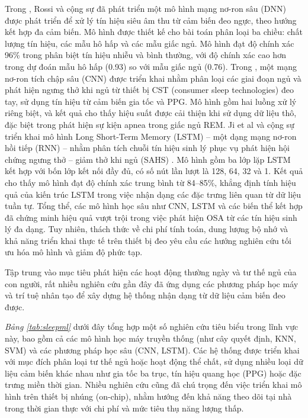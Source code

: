 Trong \cite{rossi2023sleep}, Rossi và cộng sự đã phát triển một mô hình mạng nơ-ron sâu 
(DNN) được phát triển 
để xử lý tín hiệu siêu âm
thu từ cảm biến đeo ngực, theo hướng kết hợp đa cảm biến. 
Mô hình được thiết kế cho bài toán phân loại ba chiều: 
chất lượng tín hiệu, các mẫu hô hấp và các mẫu giấc ngủ. 
Mô hình đạt độ chính xác 96\% trong phân biệt tín hiệu nhiễu 
và bình thường, với độ chính xác cao hơn trong dự đoán mẫu 
hô hấp (0.93) so với mẫu giấc ngủ (0.76).
Trong \cite{olsen2024transfer}, một mạng nơ-ron tích chập sâu (CNN) 
được triển khai nhằm phân loại các giai đoạn ngủ và phát hiện ngưng 
thở khi ngủ từ thiết bị CST (consumer sleep technologies) đeo tay, 
sử dụng tín hiệu từ cảm biến gia tốc và PPG. Mô hình gồm hai luồng 
xử lý riêng biệt, và kết quả cho thấy hiệu suất được cải thiện khi 
sử dụng dữ liệu thô, đặc biệt trong phát hiện sự kiện apnea trong 
giấc ngủ REM. 
Ji et al và cộng sự triển khai mô hình Long Short-Term Memory (LSTM) 
– một dạng mạng nơ-ron hồi tiếp (RNN) – 
nhằm phân tích chuỗi tín hiệu sinh lý phục vụ phát hiện hội chứng ngưng thở – 
giảm thở khi ngủ (SAHS) \cite{ji2022airline}. 
Mô hình gồm ba lớp lặp LSTM kết hợp với bốn lớp kết nối đầy đủ, 
có số nút lần lượt là 128, 64, 32 và 1. Kết quả cho thấy mô hình 
đạt độ chính xác trung bình từ 84–85\%, khẳng định tính hiệu quả 
của kiến trúc LSTM trong việc nhận dạng các đặc trưng liên quan 
từ dữ liệu tuần tự.
Tổng thể, các mô hình học sâu như CNN, LSTM và các biến thể kết hợp đã 
chứng minh hiệu quả vượt trội trong việc phát hiện OSA từ các tín hiệu 
sinh lý đa dạng. Tuy nhiên, thách thức về chi phí tính toán, 
dung lượng bộ nhớ và khả năng triển khai thực tế trên thiết bị 
đeo yêu cầu các hướng nghiên cứu tối ưu hóa mô hình và giảm độ phức tạp.

Tập trung vào mục tiêu phát hiện các hoạt động thường ngày và 
tư thế ngủ của con người, rất nhiều nghiên cứu gần đây 
đã ứng dụng các phương pháp học máy và trí tuệ nhân tạo để xây dựng 
hệ thống nhận dạng từ dữ liệu cảm biến đeo được. 

\textit{Bảng \ref{tab:sleepml}} dưới đây tổng hợp một số nghiên cứu tiêu biểu trong lĩnh vực này, bao gồm cả các mô hình học máy truyền thống (như cây quyết định, KNN, SVM) và các phương pháp học sâu (CNN, LSTM). Các hệ thống được triển khai với mục đích phân loại tư thế ngủ hoặc hoạt động thể chất, sử dụng nhiều loại dữ liệu cảm biến khác nhau như gia tốc ba trục, tín hiệu quang học (PPG) hoặc đặc trưng miền thời gian. Nhiều nghiên cứu cũng đã chú trọng đến việc triển khai mô hình trên thiết bị nhúng (on-chip), nhằm hướng đến khả năng theo dõi tại nhà trong thời gian thực với chi phí và mức tiêu thụ năng lượng thấp.

